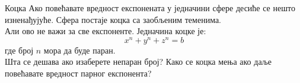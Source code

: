 \begin{surferPage}{Коцка}
Ако повећавате вредност експонената у једначини сфере десиће се нешто изненађујуће. Сфера постаје коцка са заобљеним теменима.\\
\vspace{0.3cm}
Али ово не важи за све експоненте. Једначина коцке је:
\[x^n+y^n+z^n=b\]
где број $n$ мора да буде паран.\\
\vspace{0.3cm}
Шта се дешава ако изаберете непаран број? Како се коцка мења ако даље повећавате вредност парног експонента?
\end{surferPage}

